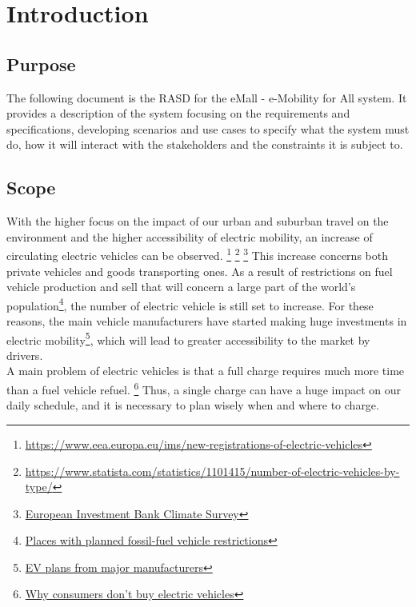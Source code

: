 \section{Introduction}\label{intro}
\subsection{Purpose}
The following document is the RASD for the eMall - e-Mobility for All system. It provides
a description of the system focusing on the requirements and specifications, developing scenarios and use cases
to specify what the system must do, how it will interact with the stakeholders and the constraints it is subject to.

\subsection{Scope}
With the higher focus on the impact of our urban and suburban travel on the environment and the higher accessibility of electric mobility, an increase of circulating electric vehicles can be observed.
\footnote{\url{https://www.eea.europa.eu/ims/new-registrations-of-electric-vehicles}} \footnote{\url{https://www.statista.com/statistics/1101415/number-of-electric-vehicles-by-type/}} \footnote{\href{https://www.eib.org/en/surveys/climate-survey/4th-climate-survey/hybrid-electric-petrol-cars-flying-holidays-climate.htm}{European Investment Bank Climate Survey}}
This increase concerns both private vehicles and goods transporting ones.
As a result of restrictions on fuel vehicle production and sell that will concern a large part of the world's population\footnote{\href{https://en.wikipedia.org/wiki/Phase-out\_of\_fossil\_fuel\_vehicles\#Places\_with\_planned\_fossil-fuel\_vehicle\_restrictions}{Places with planned fossil-fuel vehicle restrictions}}, the number of
electric vehicle is still set to increase. For these reasons, the main vehicle manufacturers have started making huge investments in electric mobility\footnote{\href{https://en.wikipedia.org/wiki/Electric\_car\#EV\_plans\_from\_major\_manufacturers}{EV plans from major manufacturers}}, which will lead to greater accessibility to the market by drivers.\\
A main problem of electric vehicles is that a full charge requires much more time than a fuel vehicle refuel.
\footnote{\href{https://blinkcharging.com/fact-from-fiction-the-real-reason-why-consumers-dont-buy-electric-vehicles/?locale=en}{Why consumers don't buy electric vehicles}}
Thus, a single charge can have a huge impact on our daily schedule, and it is necessary to plan wisely when and where to charge.

